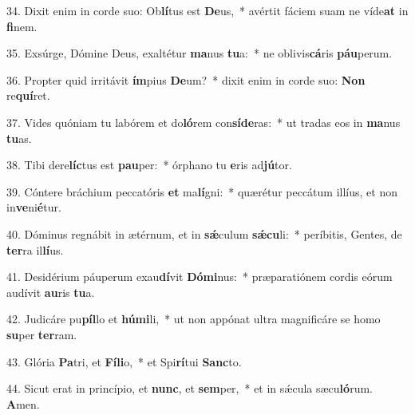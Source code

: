 34. Dixit enim in corde suo: Ob\textbf{lí}tus est \textbf{De}us,~*  avértit fáciem suam ne víde\textbf{at} in \textbf{fi}nem.\

35. Exsúrge, Dómine Deus, exaltétur \textbf{ma}nus \textbf{tu}a:~*  ne oblivis\textbf{cá}ris \textbf{páu}perum.\

36. Propter quid irritávit \textbf{ím}pius \textbf{De}um?~*  dixit enim in corde suo: \textbf{Non} re\textbf{quí}ret.\

37. Vides quóniam tu labórem et do\textbf{ló}rem con\textbf{sí}\textbf{de}ras:~*  ut tradas eos in \textbf{ma}nus \textbf{tu}as.\

38. Tibi dere\textbf{líc}tus est \textbf{pau}per:~*  órphano tu \textbf{e}ris ad\textbf{jú}tor.\

39. Cóntere bráchium peccatóris \textbf{et} ma\textbf{lí}gni:~*  quærétur peccátum illíus, et non in\textbf{ve}ni\textbf{é}tur.\

40. Dóminus regnábit in ætérnum, et in \textbf{sǽ}culum \textbf{sǽ}\textbf{cu}li:~*  períbitis, Gentes, de \textbf{ter}ra il\textbf{lí}us.\

41. Desidérium páuperum exau\textbf{dí}vit \textbf{Dó}\textbf{mi}nus:~*  præparatiónem cordis eórum audívit \textbf{au}ris \textbf{tu}a.\

42. Judicáre pu\textbf{píl}lo et \textbf{hú}\textbf{mi}li,~*  ut non appónat ultra magnificáre se homo \textbf{su}per \textbf{ter}ram.\

43. Glória \textbf{Pa}tri, et \textbf{Fí}\textbf{li}o,~*  et Spi\textbf{rí}tui \textbf{Sanc}to.\

44. Sicut erat in princípio, et \textbf{nunc}, et \textbf{sem}per,~*  et in sǽcula sæcu\textbf{ló}rum. \textbf{A}men.\

